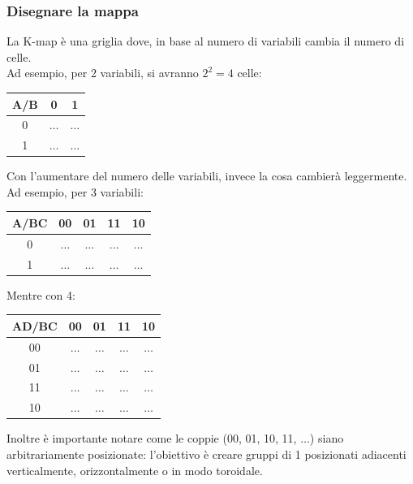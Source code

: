 \documentclass[12pt]{article}
\begin{document}
\subsubsection{Disegnare la mappa}
La K-map è una griglia dove, in base al numero di variabili cambia il numero di celle.\\
Ad esempio, per 2 variabili, si avranno $2^2 = 4$ celle:
\begin{center}
    \begin{tabular}{|| c | c c ||}
        \hline
        A/B & 0 & 1\\
        \hline
        0 & $\dots$ & $\dots$\\
        1 & $\dots$ & $\dots$\\
        \hline
    \end{tabular}
\end{center}
Con l'aumentare del numero delle variabili, invece la cosa cambierà leggermente.\\
Ad esempio, per 3 variabili:
\begin{center}
    \begin{tabular}{|| c | c c c c ||}
        \hline
        A/BC & 00 & 01 & 11 & 10\\
        \hline
        0 & $\dots$ & $\dots$ & $\dots$ & $\dots$\\
        \hline
        1 & $\dots$ & $\dots$ & $\dots$ & $\dots$\\
        \hline  
    \end{tabular}
\end{center}
Mentre con 4:
\begin{center}
    \begin{tabular}{|| c | c c c c ||}
        \hline
        AD/BC & 00 & 01 & 11 & 10\\
        \hline
        00 & $\dots$ & $\dots$ & $\dots$ & $\dots$\\
        \hline
        01 & $\dots$ & $\dots$ & $\dots$ & $\dots$\\
        \hline
        11 & $\dots$ & $\dots$ & $\dots$ & $\dots$\\
        \hline
        10 & $\dots$ & $\dots$ & $\dots$ & $\dots$\\
        \hline
    \end{tabular}
\end{center}
Inoltre è importante notare come le coppie (00, 01, 10, 11, $\dots$) siano arbitrariamente posizionate: l'obiettivo è creare gruppi di 1 posizionati adiacenti verticalmente, orizzontalmente o in modo toroidale.
\end{document}
